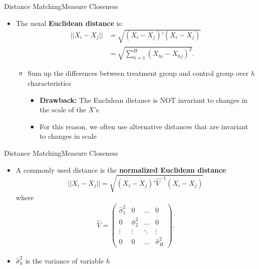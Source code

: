 \documentclass[dvipsnames,hyperref={pdfpagelabels=false}]{beamer}
\begin{document}
\begin{frame}{Distance Matching}{Measure Closeness}
\begin{itemize}

\item The usual \textbf{Euclidean distance} is:
	\begin{equation*}
	\begin{aligned}
	||X_i-X_j||&=\sqrt{(X_i-X_j)'(X_i-X_j)} \\
	&=\sqrt{\sum^H_{h=1}(X_{hi}-X_{hj})^2}.
	\end{aligned}	
	\end{equation*}
\begin{itemize}
	
\item Sum up the differences between treatment group and control group over $h$ characteristics	
	\vspace{0.2cm}	
	\begin{itemize}
\item\textbf{Drawback:} The Euclidean distance is NOT invariant to changes in the scale of the $X$'s
\vspace{0.2cm}
\item For this reason, we often use alternative distances that are invariant to changes in scale
\end{itemize}

\end{itemize}
\end{itemize}
\end{frame}


\begin{frame}{Distance Matching}{Measure Closeness}
\begin{itemize}

\item A commonly used distance is the \textbf{normalized Euclidean distance}
	\begin{equation*}
	||X_i-X_j||=\sqrt{(X_i-X_j)'\widehat{V}^{-1}(X_i-X_j)} 
	\end{equation*}
where
	\begin{align*}
	\hat{V}=\left(
	\begin{array}{cccc}
	\hat{\sigma}^2_1& 0& ...& 0 \\
	0 & \hat{\sigma}^2_2 & ... & 0 \\
	\vdots & \vdots & \ddots & \vdots \\
	0 & 0 & ... & \hat{\sigma}^2_H
	\end{array}\right).
	\end{align*}
	\item $\hat{\sigma}^2_{h}$ is the variance of variable $h$	
\vspace{0.2cm}

\end{itemize}
\end{frame}
\end{document}
